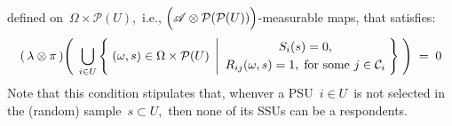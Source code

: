 \begin{itemize}
    defined on \,$\Omega \times \mathcal{P}(U)$,\,
    i.e.,
    $\left(\mathscr{A} \overset{{\color{white}.}}{\otimes} \mathcal{P}(\mathcal{P}(U))\right)$-measurable maps, that satisfies:
    \begin{equation*}
    (\,\lambda\otimes\pi\,)\!\left(\;\,
        \underset{i \in U}{\bigcup}\left\{\;
            (\omega,s) \in \Omega\times\mathcal{P}(U)
            \;\left\vert
            \begin{array}{c}
            S_{i}(s) = 0, %
            \\
            \overset{{\color{white}.}}{R_{ij}(\omega,s) = 1},\;
            \textnormal{for some $j \in \mathcal{C}_{i}$}
            \end{array}
            \right.
            \!\!\right\}
        \;\right)
    \; = \;
        0
    \end{equation*}
    Note that this condition stipulates that,
    whenver a PSU \,$i \in U$\, is not selected in the (random) sample \,$s \subset U$,\,
    then none of its SSUs can be a respondents.
\end{itemize}

